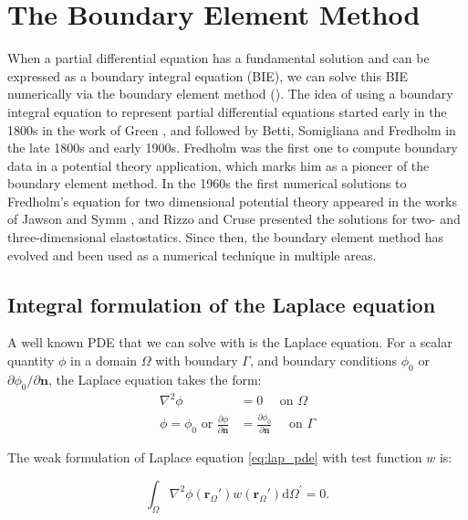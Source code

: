 \section{The Boundary Element Method} \label{sec:lspr_bem}

When a partial differential equation has a fundamental solution and can be expressed as a boundary integral equation (BIE), we can 
solve this BIE numerically via the boundary element method (\bem). The idea of using a boundary integral equation to represent partial 
differential equations started early in the 1800s in the work of Green \cite{Green1828}, and followed by Betti, Somigliana and Fredholm \cite{Betti1872,Somigliana1885,Fredholm1903} 
in the late 1800s and early 1900s. Fredholm was the first one to compute boundary data in a potential theory application, which marks him as a 
pioneer of the boundary element method. In the 1960s the first numerical solutions to Fredholm's equation for two dimensional potential theory appeared in 
the works of Jawson \cite{Jawson1963} and Symm \cite{Symm1963}, and Rizzo \cite{Rizzo1967} and Cruse \cite{Cruse1969} presented the solutions for 
two- and three-dimensional elastostatics. Since then, the boundary element method has evolved and been used as a numerical technique in 
multiple areas\cite{Atkinson1997,McLean2000,Steinbach2008, BrebbiaDominguez1992, Katsikadelis2002}.


\subsection{Integral formulation of the Laplace equation} \label{ssec:int_form}

A well known PDE that we can solve with \bem is the Laplace equation. For a scalar quantity $\phi$ in a domain $\Omega$ with boundary $\Gamma$, and 
boundary conditions $\phi_0$ or $\partial \phi_0/\partial \mathbf{n}$, the Laplace equation takes the form:
%
\begin{align} \label{eq:lap_pde}
\nabla^2\phi &= 0 \quad \text{ on $\Omega$} \nonumber \\
\phi = \phi_0 \text{ or } \frac{\partial \phi}{\partial \mathbf{n}} &= \frac{\partial \phi_0}{\partial \mathbf{n}} \quad \text{ on $\Gamma$} 
\end{align}

The weak formulation of Laplace equation \eqref{eq:lap_pde} with test function $w$ is:

\begin{equation} \label{eq:lap_weak}
\int_\Omega \nabla^2 \phi(\mathbf{r}_\Omega') w(\mathbf{r}_\Omega') \text{d} \Omega^\prime= 0.
\end{equation}

